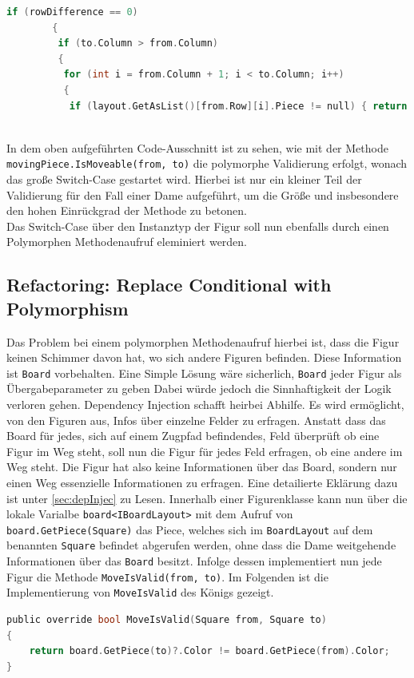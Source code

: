 \documentclass[
10pt, %
a4paper, %
oneside, %
headinclude,footinclude, %
BCOR5mm, %
]{scrartcl}
\begin{document}
\begin{onehalfspace}
\begin{lstlisting}[language=c, style=mStyle]
	    if (rowDifference == 0)
		{
		 if (to.Column > from.Column)
		 {
		  for (int i = from.Column + 1; i < to.Column; i++)
		  {
		   if (layout.GetAsList()[from.Row][i].Piece != null) { return false; }
		  
\end{lstlisting}
In dem oben aufgeführten Code-Ausschnitt ist zu sehen, wie mit der Methode \texttt{movingPiece.IsMoveable(from, to)} die polymorphe Validierung erfolgt, wonach das große Switch-Case gestartet wird. Hierbei ist nur ein kleiner Teil der Validierung für den Fall einer Dame aufgeführt, um die Größe  und insbesondere den hohen Einrückgrad der Methode zu betonen. \\
Das Switch-Case über den Instanztyp der Figur soll nun ebenfalls durch einen Polymorphen Methodenaufruf eleminiert werden. 

\subsection{Refactoring: Replace Conditional with Polymorphism}
Das Problem bei einem polymorphen Methodenaufruf hierbei ist, dass die Figur keinen Schimmer davon hat, wo sich andere Figuren befinden. Diese Information ist \texttt{Board} vorbehalten. Eine Simple Lösung wäre sicherlich, \texttt{Board} jeder Figur als Übergabeparameter zu geben Dabei würde jedoch die Sinnhaftigkeit der Logik verloren gehen. Dependency Injection schafft heirbei Abhilfe. Es wird ermöglicht, von den Figuren aus, Infos über einzelne Felder zu erfragen. Anstatt dass das Board für jedes, sich auf einem Zugpfad befindendes, Feld überprüft ob eine Figur im Weg steht, soll nun die Figur für jedes Feld erfragen, ob eine andere im Weg steht. Die Figur hat also keine Informationen über das Board, sondern nur einen Weg essenzielle Informationen zu erfragen. Eine detailierte Eklärung dazu ist unter \autoref{sec:depInjec} zu Lesen. Innerhalb einer Figurenklasse kann nun über die lokale Varialbe \texttt{board<IBoardLayout>} mit dem Aufruf von  \texttt{board.GetPiece(Square)} das Piece, welches sich im \texttt{BoardLayout} auf dem benannten \texttt{Square} befindet abgerufen werden, ohne dass die Dame weitgehende Informationen über das \texttt{Board} besitzt.
Infolge dessen implementiert nun jede Figur die Methode \texttt{MoveIsValid(from, to)}. Im Folgenden ist die Implementierung von \texttt{MoveIsValid} des Königs gezeigt.

\begin{lstlisting}[language=c, style=mStyle]
public override bool MoveIsValid(Square from, Square to)
{
	return board.GetPiece(to)?.Color != board.GetPiece(from).Color;
}
\end{lstlisting}


\end{onehalfspace}
\end{document}
